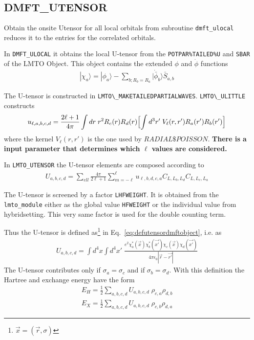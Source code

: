 \documentclass[11pt,a4paper]{report}
\begin{document}
\subsection{DMFT\_UTENSOR}
\label{sec:routinedmftutensor}
Obtain the onsite Utensor for all local orbitals from subroutine
\verb|dmft_ulocal| reduces it to the entries for the correlated
orbitals.

In \verb|DMFT_ULOCAL| it obtains the local U-tensor from the
\verb|POTPAR%TAILED%U| and \verb|SBAR| of the LMTO Object. This object
contains the extended $\phi$ and $\dot{\phi}$ functions
\begin{eqnarray}
|\chi_a\rangle=|\phi_a\rangle-
\sum_{b; R_b=R_a}|\dot{\bar{\phi}}_b\rangle \bar{S}_{a,b}
\end{eqnarray}


The U-tensor is constructed in \verb|LMTO\_MAKETAILEDPARTIALWAVES|.
\verb|LMTO\_ULITTLE| constructs
\begin{eqnarray}
u_{\ell,a,b,c,d}
=\frac{2\ell+1}{4\pi}
\int dr\; r^2R_c(r)R_d(r)\Bigl[\int d^3r'\;V_\ell(r,r')R_a(r')R_b(r')\Bigr]
\end{eqnarray}
where the kernel $V_\ell(r,r')$ is the one used by $RADIAL\$POISSON$.
\textbf{There is a input parameter that determines which $\ell$ values are
considered.}

In \verb|LMTO_UTENSOR| the U-tensor elements are composed according to
\begin{eqnarray}
U_{a,b,c,d}=\sum_{ell}\frac{4\pi}{2\ell+1}\sum_{m=-\ell}^\ell
u_{\ell,b,d,c,a} C_{L,L_b,L_d}C_{L,L_c,L_a}
\end{eqnarray}

The U-tensor is screened by a factor \verb|LHFWEIGHT|. It is obtained
from the \verb|lmto_module| either as the global value \verb|HFWEIGHT|
or the individual value from hybridsetting. This very same factor is
used for the double counting term.

Thus the U-tensor is defined as\footnote{$\vec{x}=(\vec{r},\sigma)$}
in Eq.~\ref{eq:defutensordmftobject}, i.e. as
\begin{eqnarray}
U_{a,b,c,d}=\int d^4x\int d^4x'\;
\frac{e^2\chi^*_a(\vec{x})\chi^*_b(\vec{x'})\chi_c(\vec{x})\chi_d(\vec{x'})}
{4\pi\epsilon_0|\vec{r}-\vec{r'}|}
\end{eqnarray}
The U-tensor contributes only if $\sigma_a=\sigma_c$ and if
$\sigma_b=\sigma_d$.
With this definition the Hartree and exchange  energy have the form
\begin{eqnarray}
E_H=\frac{1}{2}\sum_{a,b,c,d}U_{a,b,c,d}\;\rho_{c,a}\rho_{d,b}
\nonumber\\
E_X=\frac{1}{2}\sum_{a,b,c,d}U_{a,b,c,d}\;\rho_{c,b}\rho_{d,a}
\end{eqnarray}
\end{document}
